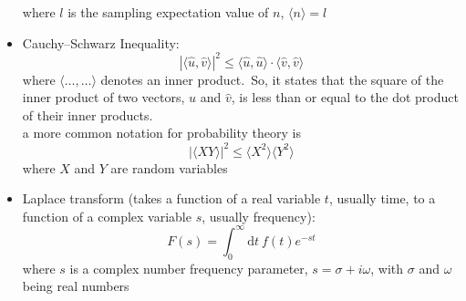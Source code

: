 \documentclass[../jaynes_prob_theory_notes.tex]{subfiles}
\begin{document}
\begin{itemize}
            where \(l\) is the sampling expectation value of \(n\), \(\langle n \rangle = l\)
        \item Cauchy--Schwarz Inequality:
            \begin{equation*} 
                {|\langle \hat{u}, \hat{v} \rangle|}^2 \leq \langle \hat{u}, \hat{u} \rangle \cdot \langle \hat{v}, \hat{v} \rangle
            \end{equation*}
            where \(\langle \ldots, \ldots \rangle\) denotes an inner product.\ So, it states that the square of the inner product of two vectors, \(\hat{u}\) and \(\hat{v}\), is less than or equal to the dot product of their inner products.\\
            a more common notation for probability theory is
            \begin{equation*} 
                {|\langle XY \rangle|}^2 \leq {\langle X^2 \rangle} {\langle Y^2 \rangle}
            \end{equation*}
            where \(X\) and \(Y\) are random variables
        \item Laplace transform (takes a function of a real variable \(t\), usually time, to a function of a complex variable \(s\), usually frequency):
            \begin{equation*} 
                F(s) = \int^{\infty}_{0} \text{d}t~f(t)e^{-st}
            \end{equation*}
            where \(s\) is a complex number frequency parameter, \(s = \sigma + i\omega\), with \(\sigma\) and \(\omega\) being real numbers
    \end{itemize}
\end{document}
